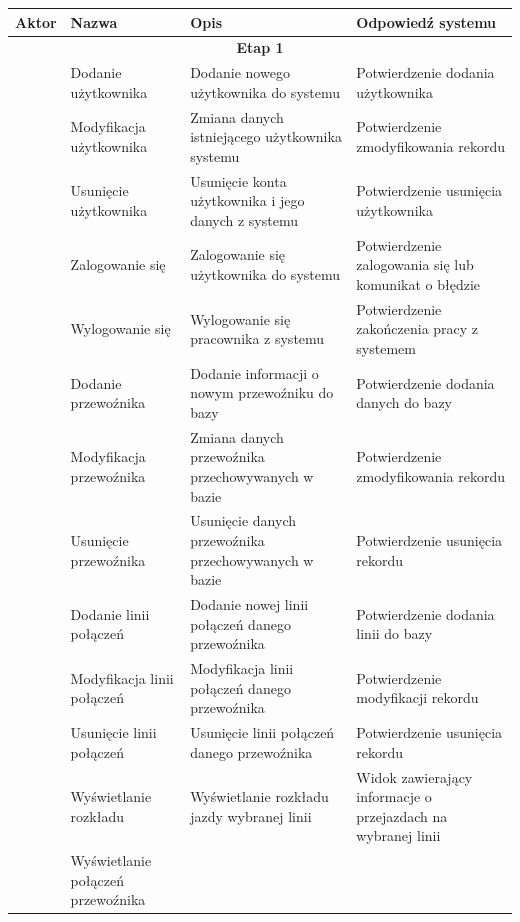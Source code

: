 \documentclass[10pt,a4paper]{article}
\begin{document}
\begin{table}[H]
	\begin{tabularx}{\textwidth}{|c|X|X|X|}
		\hline
		\textbf{Aktor} & \textbf{Nazwa} & \textbf{Opis} & \textbf{Odpowiedź systemu} \\
		\hline
		\multicolumn{4}{|c|}{\textbf{Etap 1}} \\
		\hline
		\multirow{6}{*}{\rotatebox[origin=c]{90}{Administrator}}
		& Dodanie użytkownika
		& Dodanie nowego użytkownika do systemu
		& Potwierdzenie dodania użytkownika \\
		\cline {2-4}
		& Modyfikacja użytkownika
		& Zmiana danych istniejącego użytkownika systemu
		& Potwierdzenie zmodyfikowania rekordu \\
		\cline{2-4}
		& Usunięcie użytkownika
		& Usunięcie konta użytkownika i jego danych z systemu
		& Potwierdzenie usunięcia użytkownika \\
		\hline
		\multirow{26}{*}{\rotatebox[origin=c]{90}{Pracownik}}
		& Zalogowanie się 
		& Zalogowanie się użytkownika do systemu
		& Potwierdzenie zalogowania się lub komunikat o błędzie \\
		\cline{2-4}
		& Wylogowanie się
		& Wylogowanie się pracownika z systemu
		& Potwierdzenie zakończenia pracy z systemem \\
		\cline{2-4}
		& Dodanie przewoźnika
		& Dodanie informacji o nowym przewoźniku do bazy
		& Potwierdzenie dodania danych do bazy \\
		\cline{2-4}
		& Modyfikacja przewoźnika
		& Zmiana danych przewoźnika przechowywanych w bazie
		& Potwierdzenie zmodyfikowania rekordu \\
		\cline{2-4}
		& Usunięcie przewoźnika
		& Usunięcie danych przewoźnika przechowywanych w bazie
		& Potwierdzenie usunięcia rekordu \\
		\cline{2-4}
		& Dodanie linii połączeń
		& Dodanie nowej linii połączeń danego przewoźnika
		& Potwierdzenie dodania linii do bazy \\
		\cline{2-4}
		& Modyfikacja linii połączeń
		& Modyfikacja linii połączeń danego przewoźnika
		& Potwierdzenie modyfikacji rekordu \\
		\cline{2-4}
		& Usunięcie linii połączeń
		& Usunięcie linii połączeń danego przewoźnika
		& Potwierdzenie usunięcia rekordu \\
		\cline{2-4}
		& Wyświetlanie rozkładu
		& Wyświetlanie rozkładu jazdy wybranej linii
		& Widok zawierający informacje o przejazdach na wybranej linii \\
		\cline{2-4}
		& Wyświetlanie połączeń przewoźnika

\end{tabularx}
\end{table}
\end{document}
